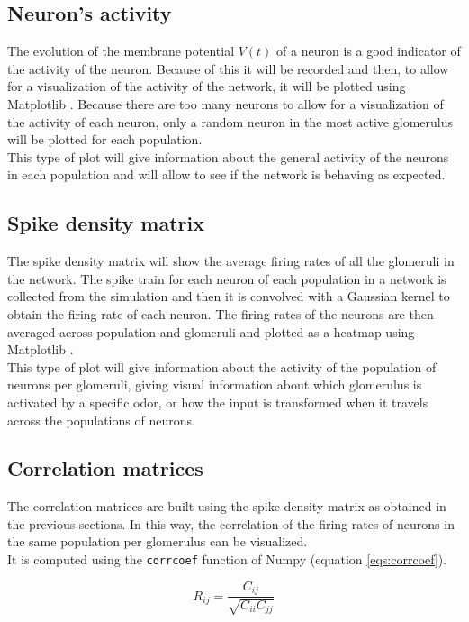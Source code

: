   \subsection{Neuron's activity}
  The evolution of the membrane potential $V(t)$ of a neuron is a good indicator of the activity of the neuron.
  Because of this it will be recorded and then, to allow for a visualization of the activity of the network, it will be plotted using Matplotlib \cite{matplotlib}.
  Because there are too many neurons to allow for a visualization of the activity of each neuron, only a random neuron in the most active glomerulus will be plotted for each population.\\
  This type of plot will give information about the general activity of the neurons in each population and will allow to see if the network is behaving as expected.

  \subsection{Spike density matrix}
  The spike density matrix will show the average firing rates of all the glomeruli in the network.
  The spike train for each neuron of each population in a network is collected from the simulation and then it is convolved with a Gaussian kernel to obtain the firing rate of each neuron.
  The firing rates of the neurons are then averaged across population and glomeruli and plotted as a heatmap using Matplotlib \cite{matplotlib}.\\
  This type of plot will give information about the activity of the population of neurons per glomeruli, giving visual information about which glomerulus is activated by a specific odor, or how the input is transformed when it travels across the populations of neurons.

  \subsection{Correlation matrices}
  The correlation matrices are built using the spike density matrix as obtained in the previous sections.
  In this way, the correlation of the firing rates of neurons in the same population per glomerulus can be visualized.\\
  It is computed using the \texttt{corrcoef} function of Numpy \cite{numpy} (equation \ref{eqs:corrcoef}).

  \begin{equation}
    R_{ij} = \frac{C_{ij}}{\sqrt{C_{ii}C_{jj}}}
    \label{eqs:corrcoef}
  \end{equation}

